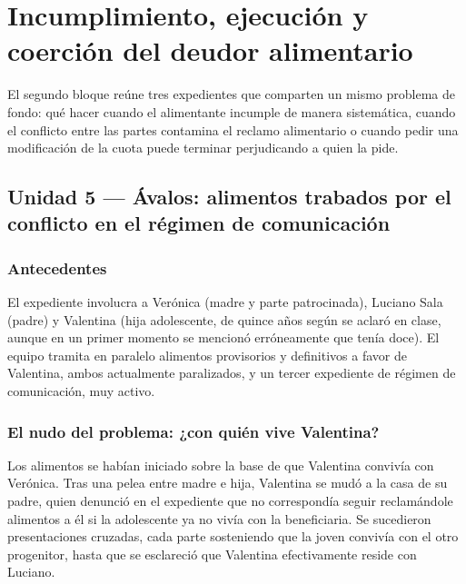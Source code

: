 \documentclass[12pt,oneside]{book}
\begin{document}
\chapter[Incumplimiento, ejecución y coerción]{Incumplimiento, ejecución y coerción del deudor alimentario}

El segundo bloque reúne tres expedientes que comparten un mismo problema de fondo: qué hacer cuando el alimentante incumple de manera sistemática, cuando el conflicto entre las partes contamina el reclamo alimentario o cuando pedir una modificación de la cuota puede terminar perjudicando a quien la pide.

\section{Unidad 5 --- Ávalos: alimentos trabados por el conflicto en el régimen de comunicación}

\subsection{Antecedentes}

El expediente involucra a Verónica (madre y parte patrocinada), Luciano Sala (padre) y Valentina (hija adolescente, de quince años según se aclaró en clase, aunque en un primer momento se mencionó erróneamente que tenía doce). El equipo tramita en paralelo alimentos provisorios y definitivos a favor de Valentina, ambos actualmente paralizados, y un tercer expediente de régimen de comunicación, muy activo.

\subsection{El nudo del problema: ¿con quién vive Valentina?}

Los alimentos se habían iniciado sobre la base de que Valentina convivía con Verónica. Tras una pelea entre madre e hija, Valentina se mudó a la casa de su padre, quien denunció en el expediente que no correspondía seguir reclamándole alimentos a él si la adolescente ya no vivía con la beneficiaria. Se sucedieron presentaciones cruzadas, cada parte sosteniendo que la joven convivía con el otro progenitor, hasta que se esclareció que Valentina efectivamente reside con Luciano.
\end{document}
